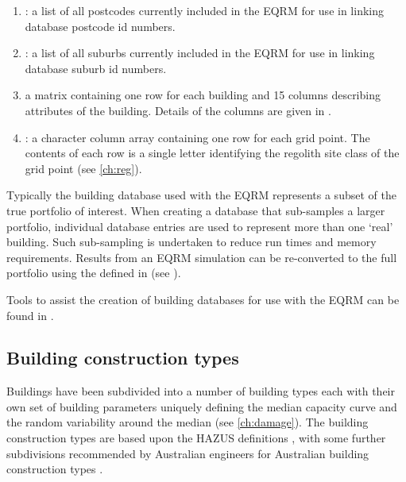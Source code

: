 \begin{enumerate}
\item {}: a list of all postcodes
currently included in the EQRM for use in linking database
postcode id numbers. \item {}: a
list of all suburbs currently included in the EQRM for use in
linking database suburb id numbers. \item
{} a matrix containing one row for
each building and 15 columns describing attributes of the
building. Details of the columns are given in
. \item
{}: a character column array containing
one row for each grid point. The contents of each row is a single
letter identifying the regolith site class of the grid point (see
\cref{ch:reg}).
\end{enumerate}
Typically the building database used with
the EQRM represents a subset of the true portfolio of interest.
When creating a database that sub-samples a larger portfolio,
individual database entries are used to represent more than one
`real' building. Such sub-sampling is undertaken to reduce run
times and memory requirements. Results from an EQRM simulation can
be re-converted to the full portfolio using the \typesf defined in
 (see
).

Tools to assist the creation of building databases for use with the EQRM can be found in
.


\subsection{Building construction types}
\label{sec:grids-constructionclass}

Buildings have been subdivided into a number of building
types each with their own set of building
parameters uniquely defining the median capacity
curve and the random variability around the
median (see \cref{ch:damage}). The building construction types are
based upon the HAZUS definitions \citep{dr_FEMA99b}, with some
further subdivisions recommended by Australian engineers for
Australian building construction types \citep{dr_Stehle01a}.

